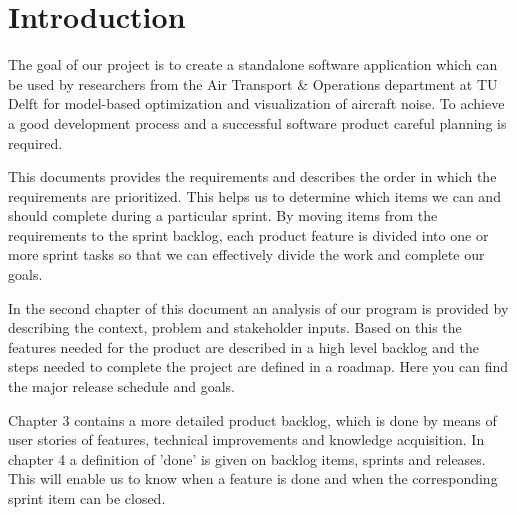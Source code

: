 \section{Introduction}

The goal of our project is to create a standalone software application which can be used by researchers from the Air Transport \& Operations department at TU Delft for model-based optimization and visualization of aircraft noise. To achieve a good development process and a successful software product careful planning is required.

This documents provides the requirements and describes the order in which the requirements are prioritized. This helps us to determine which items we can and should complete during a particular sprint. By moving items from the requirements to the sprint backlog, each product feature is divided into one or more sprint tasks so that we can effectively divide the work and complete our goals.

In the second chapter of this document an analysis of our program is provided by describing the context, problem and stakeholder inputs. Based on this the features needed for the product are described in a high level backlog and the steps needed to complete the project are defined in a roadmap. Here you can find the major release schedule and goals.

Chapter 3 contains a more detailed product backlog, which is done by means of user stories of features, technical improvements and knowledge acquisition. In chapter 4 a definition of 'done' is given on backlog items, sprints and releases. This will enable us to know when a feature is done and when the corresponding sprint item can be closed. 
